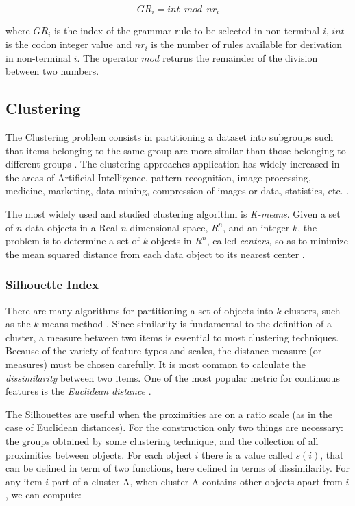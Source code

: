 \documentclass[journal]{IEEEtran}
\begin{document}
	\begin{equation}\label{eq:map}
	GR_i = int~~mod~~nr_i
	\end{equation}
	
	where $GR_i$ is the index of the grammar rule to be selected in non-terminal $i$, $int$ is the codon integer value and $nr_i$ is the number of rules available for derivation in non-terminal $i$. The operator $mod$ returns the remainder of the division between two numbers.
	
	
	\subsection{Clustering}
	
	The Clustering problem consists in partitioning a dataset into subgroups such that items belonging to the same group are more similar than those belonging to different groups \cite{boric2007genetic} \cite{ahalya2015data}. The clustering approaches application has widely increased in the areas of Artificial Intelligence, pattern recognition, image processing, medicine, marketing, data mining, compression of images or data, statistics, etc. \cite{ahalya2015data}.
	
	The most widely used and studied clustering algorithm is \textit{K-means}. Given a set of $n$ data objects in a Real $n$-dimensional space, $R^n$, and an integer $k$, the problem is to determine a set of $k$ objects in $R^n$, called \textit{centers}, so as to minimize the mean squared distance from each data object to its nearest center \cite{kanungo2002efficient}.
	
	
	\subsubsection{Silhouette Index}
	\label{sec:sillhouetteIndex}
	
	There are many algorithms for partitioning a set of objects into $k$ clusters, such as the $k$-means method \cite{kanungo2002efficient}. Since similarity is fundamental to the definition of a cluster, a measure between two items is essential to most clustering techniques. Because of the variety of feature types and scales, the distance measure (or measures) must be chosen carefully. It is most common to calculate the \textit{dissimilarity} between two items. One of the most popular metric for continuous features is the \textit{Euclidean distance} \cite{jain1988algorithms}.
	
	The Silhouettes are useful when the proximities are on a ratio scale (as in the case of Euclidean distances). For the construction only two things are necessary: the groups obtained by some clustering technique, and the collection of all proximities between objects. For each object $i$ there is a value called $s(i)$, that can be defined in term of two functions, here defined in terms of dissimilarity. For any item $i$ part of a cluster A, when cluster A contains other objects apart from $i$, we can compute:
	
\end{document}
